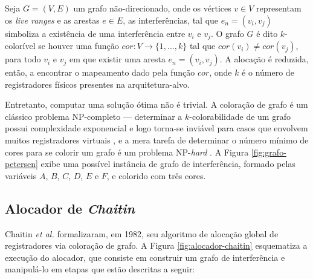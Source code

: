\documentclass[
	12pt,				%
	openright,			%
	oneside,			%
	a4paper,			%
	tccpreliminar,			%
	]{ABNT-DC-UEL}
\begin{document}
Seja $G = (V, E)$ um grafo não-direcionado, onde os vértices $v \in V$ representam os \textit{live ranges} e as arestas $e \in E$, as interferências, tal que $e_n = (v_i, v_j)$ simboliza a existência de uma interferência entre $v_i$ e $v_j$. O grafo $G$ é dito $k$-colorível se houver uma função $cor: V \to \{1,...,k\}$ tal que $cor(v_i) \ne cor(v_j)$, para todo $v_i$ e $v_j$ em que existir uma aresta
$e_n = (v_i, v_j)$. A alocação é reduzida, então, a encontrar o mapeamento dado pela função $cor$, onde $k$ é o número de registradores físicos presentes na arquitetura-alvo.

Entretanto, computar uma solução ótima não é trivial. A coloração de grafo é um clássico problema NP-completo \cite{karp:72} --- determinar a $k$-colorabilidade de um grafo possui complexidade exponencial e logo torna-se inviável para casos que envolvem muitos registradores virtuais \cite{lawler:76, bjorklund:09}, e a mera tarefa de determinar o número mínimo de cores para se colorir um grafo é um problema NP-\textit{hard} \cite{garey:76}. A Figura \ref{fig:grafo-petersen} exibe uma possível instância de grafo de interferência, formado pelas variáveis $A$, $B$, $C$, $D$, $E$ e $F$, e colorido com três cores.

\subsection{Alocador de \textit{Chaitin}}

Chaitin \textit{et al.} \cite{chaitin:82} formalizaram, em 1982, seu algoritmo de alocação global de registradores via coloração de grafo. A Figura \ref{fig:alocador-chaitin} esquematiza a execução do alocador, que consiste em construir um grafo de interferência e manipulá-lo em etapas que estão descritas a seguir:
\end{document}
